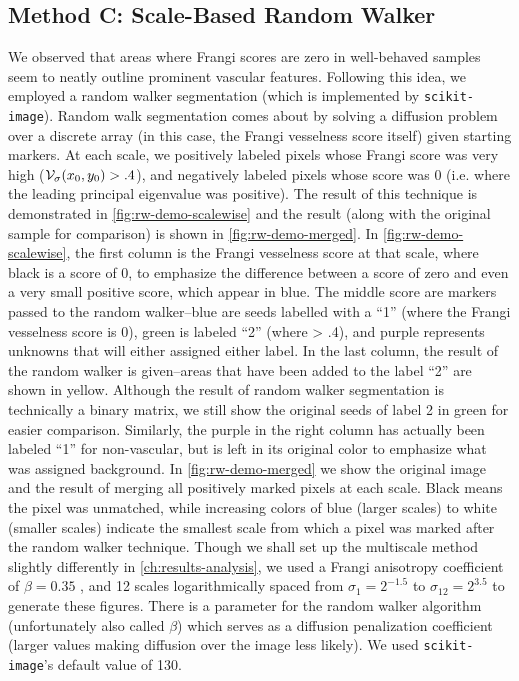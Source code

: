 \subsection{Method C: Scale-Based Random Walker}

We observed that areas where Frangi scores are zero in well-behaved samples seem to neatly outline prominent vascular features. Following this idea, we employed a random walker segmentation \cite{Grady-Random-Walks} (which is implemented by \texttt{scikit-image}). Random walk segmentation comes about by solving a diffusion problem over a discrete array (in this case, the Frangi vesselness score itself) given starting markers. At each scale, we positively labeled pixels whose Frangi score was very high ($\mathcal{V}_{\sigma}(x_0,y_0) > .4$), and negatively labeled pixels whose score was $0$ (i.e. where the leading principal eigenvalue was positive). The result of this technique is demonstrated in \cref{fig:rw-demo-scalewise} and the result (along with the original sample for comparison) is shown in \cref{fig:rw-demo-merged}.
In \cref{fig:rw-demo-scalewise}, the first column is the Frangi vesselness score at that scale, where black is a score of 0, to emphasize the difference between a score of zero and even a very small positive score, which appear in blue. The middle score are markers passed to the random walker--blue are seeds labelled with a ``1'' (where the Frangi vesselness score is 0), green is labeled ``2'' (where \Vmax > .4), and purple represents unknowns that will either assigned either label. In the last column, the result of the random walker is given--areas that have been added to the label ``2'' are shown in yellow. Although the result of random walker segmentation is technically a binary matrix, we still show the original seeds of label 2 in green for easier comparison. Similarly, the purple in the right column has actually been labeled ``1'' for non-vascular, but is left in its original color to emphasize what was assigned background. In \cref{fig:rw-demo-merged} we show the original image and the result of merging all positively marked pixels at each scale. Black means the pixel was unmatched, while increasing colors of blue (larger scales) to white (smaller scales) indicate the smallest scale from which a pixel was marked after the random walker technique.  Though we shall set up the multiscale method slightly differently in \cref{ch:results-analysis}, we used a Frangi anisotropy coefficient of $\beta=0.35$ , and 12 scales logarithmically spaced from $\sigma_1 = 2^{-1.5} $ to $\sigma_{12} = 2^{3.5}$ to generate these figures. There is a parameter for the random walker algorithm (unfortunately also called $\beta$) which serves as a diffusion penalization coefficient (larger values making diffusion over the image less likely). We used \texttt{scikit-image}'s default value of 130. 

